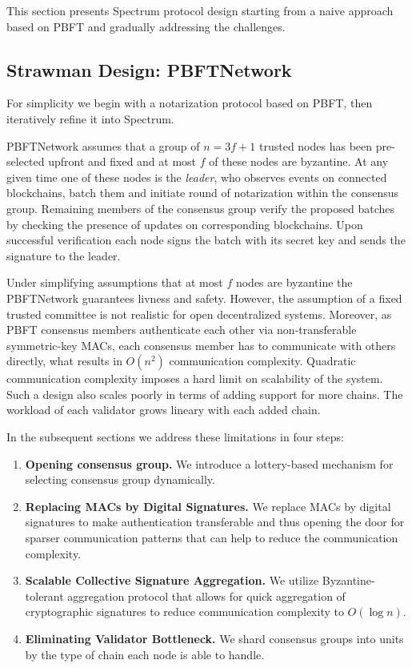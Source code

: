 This section presents Spectrum protocol design starting from a naive approach based on PBFT and gradually addressing the challenges.

\subsection{Strawman Design: PBFTNetwork}\label{subsec:strawman-design}

For simplicity we begin with a notarization protocol based on PBFT, then iteratively refine it into Spectrum.

PBFTNetwork assumes that a group of ${n = 3f + 1}$ trusted nodes has been pre-selected upfront and fixed and at most $f$ of these nodes are byzantine.
At any given time one of these nodes is the \emph{leader}, who observes events on connected blockchains,
batch them and initiate round of notarization within the consensus group.
Remaining members of the consensus group verify the proposed batches by checking the presence of updates on corresponding blockchains.
Upon successful verification each node signs the batch with its secret key and sends the signature to the leader.

Under simplifying assumptions that at most $f$ nodes are byzantine the PBFTNetwork guarantees livness and safety.
However, the assumption of a fixed trusted committee is not realistic for open decentralized systems.
Moreover, as PBFT consensus members authenticate each other via non-transferable symmetric-key MACs, each consensus
member has to communicate with others directly, what results in $O(n^2)$ communication complexity.
Quadratic communication complexity imposes a hard limit on scalability of the system.
Such a design also scales poorly in terms of adding support for more chains.
The workload of each validator grows lineary with each added chain.

In the subsequent sections we address these limitations in four steps:
\begin{enumerate}
    \item \textbf{Opening consensus group.} We introduce a lottery-based mechanism for selecting consensus group dynamically.
    \item \textbf{Replacing MACs by Digital Signatures.} We replace MACs by digital signatures to make authentication transferable
    and thus opening the door for sparser communication patterns that can help to reduce the communication complexity.
    \item \textbf{Scalable Collective Signature Aggregation.} We utilize Byzantine-tolerant aggregation protocol that allows for
    quick aggregation of cryptographic signatures to reduce communication complexity to $O(\log n)$.
    \item \textbf{Eliminating Validator Bottleneck.} We shard consensus groups into units by the type of chain each node is able to handle.
\end{enumerate}

